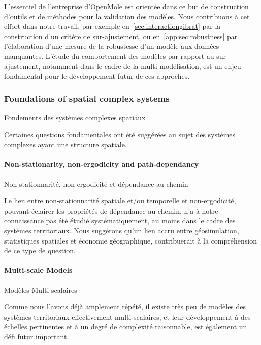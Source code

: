 

L'essentiel de l'entreprise d'OpenMole est orientée dans ce but de construction d'outils et de méthodes pour la validation des modèles. Nous contribuons à cet effort dans notre travail, par exemple en~\ref{sec:interactiongibrat} par la construction d'un critère de sur-ajustement, ou en~\ref{app:sec:robustness} par l'élaboration d'une mesure de la robustesse d'un modèle aux données manquantes. L'étude du comportement des modèles par rapport au sur-ajustement, notamment dans le cadre de la multi-modélisation, est un enjeu fondamental pour le développement futur de ces approches.





\subsubsection*{Foundations of spatial complex systems}{Fondements des systèmes complexes spatiaux}

Certaines questions fondamentales ont été suggérées au sujet des systèmes complexes ayant une structure spatiale.

\paragraph{Non-stationarity, non-ergodicity and path-dependancy}{Non-stationnarité, non-ergodicité et dépendance au chemin}


Le lien entre non-stationnarité spatiale et/ou temporelle et non-ergodicité, pouvant éclairer les propriétés de dépendance au chemin, n'a à notre connaissance pas été étudié systématiquement, au moins dans le cadre des systèmes territoriaux. Nous suggérons qu'un lien accru entre géosimulation, statistiques spatiales et économie géographique, contribuerait à la compréhension de ce type de question.



\paragraph{Multi-scale Models}{Modèles Multi-scalaires}


Comme nous l'avons déjà amplement répété, il existe très peu de modèles des systèmes territoriaux effectivement multi-scalaires, et leur développement à des échelles pertinentes et à un degré de complexité raisonnable, est également un défi futur important.

